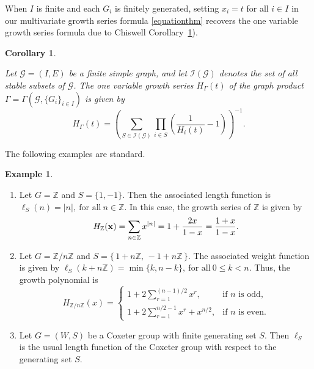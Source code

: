 \documentclass[11pt,reqno]{amsart}
\numberwithin{equation}{section} %
\newtheorem{cor}{Corollary}
\theoremstyle{definition}
\newtheorem{example}{Example}
\theoremstyle{remark}
\numberwithin{equation}{section}
\begin{document}
When $I$ is finite and each $G_i$ is finitely generated, setting $x_i = t$ for all $i \in I$ in our multivariate growth series formula \eqref{equationthm} recovers the one variable growth series formula due to Chiswell \cite{Chiswell94} Corollary~\ref{chiswellcor}).


\begin{cor}\label{chiswellcor}

    Let $\mathcal{G}=(I,E)$ be a finite simple graph, and let $\mathcal{I}(\mathcal{G})$ denotes the set of all stable subsets of $\mathcal{G}$. The  one variable growth series $H_{\Gamma}(t)$ of the graph product $\Gamma =  \Gamma(\mathcal G, \{G_i\}_{i\in I}) $ is given by
\begin{equation}\label{equationcor}
H_{\Gamma}(t) = \left( \sum_{S \in \mathcal{I}(\mathcal{G})} \prod_{i \in S} \left( \frac{1}{H_i(t)} - 1 \right) \right)^{-1}.
\end{equation}
\end{cor}


The following examples are standard.
\begin{example}
    \begin{enumerate}
\item Let $G=\mathbb{Z}$ and $S=\{1,-1\}$. Then the associated length function is
$\ell_S(n)=|n|,\ \text{for all}\ n\in\mathbb{Z}.$ In this case, the growth series of $\mathbb Z$ is given by $$H_{\mathbb Z}(\bold x) = \sum_{n\in \mathbb Z}x^{|n|}=1+\frac{2x}{1-x}=\frac{1+x}{1-x}.$$

\item Let $G=\mathbb{Z}/n\mathbb{Z}$ and $
S=\{\,1+n\mathbb{Z},\, -1+n\mathbb{Z}\,\}.$
The associated weight function is given by
$\ell_S(k+n\mathbb Z)=\min\{k,n-k\},\ \text{for all}\ 0\le k<n.$ Thus, the growth polynomial is
\[
H_{\mathbb Z/n\mathbb Z}(x)=
\begin{cases}
\displaystyle
1+2\sum_{r=1}^{(n-1)/2}x^r,
& \text{if } n \text{ is odd},\\[2ex]
\displaystyle
1+2\sum_{r=1}^{n/2-1}x^r+x^{n/2},
& \text{if } n \text{ is even}.
\end{cases}
\]

\item Let $G=(W, S)$ be a Coxeter group with finite generating set $S.$ Then $\ell_S$ is the usual length function of the Coxeter group with respect to the generating set $S.$
\end{enumerate}
\end{example}
\end{document}
